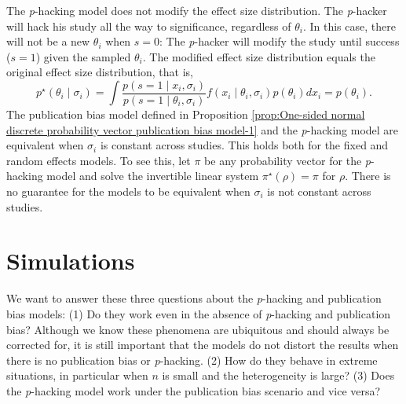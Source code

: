 \documentclass[useAMS,usenatbib,referee]{biom}
\begin{document}

The \textit{p}-hacking model does not modify the effect size distribution. The \textit{p}-hacker will hack his study all the way to significance, regardless of $\theta_i$. In this case, there will not be a new $\theta_i$ when $s=0$: The \textit{p}-hacker will modify the study until success ($s=1$) given the sampled $\theta_i$. The modified effect size distribution equals the original effect size distribution, that is, 
\[
p^\star(\theta_i\mid \sigma_i)=\int\frac{p(s=1\mid x_i, \sigma_i)}{p(s=1\mid \theta_i, \sigma_i)}f(x_i \mid \theta_i, \sigma _i) p(\theta_i)dx_i = p(\theta_i).
\]
The publication bias model defined in Proposition \ref{prop:One-sided normal discrete probability vector publication bias model-1} and the \textit{p}-hacking model are equivalent when $\sigma_{i}$ is constant across studies. This holds both for the fixed and random effects models. To see this, let $\pi$ be any probability vector for the \textit{p}-hacking model and solve the invertible linear system $\pi^{\star}(\rho)=\pi$ for $\rho$. There is no guarantee for the models to be equivalent when $\sigma_{i}$ is not constant across studies. 
\section{Simulations}\label{sect:simulations}

We want to answer these three questions about the \textit{p}-hacking and publication bias models: (1) Do they work even in the absence of \textit{p}-hacking and publication bias? Although we know these phenomena are ubiquitous and should always be corrected for, it is still important that the models do not distort the results when there is no publication bias or \textit{p}-hacking. (2) How do they behave in extreme situations, in particular when $n$ is small and the heterogeneity is large? (3) %
Does the \textit{p}-hacking model work under the publication bias scenario and vice versa?
\end{document}

